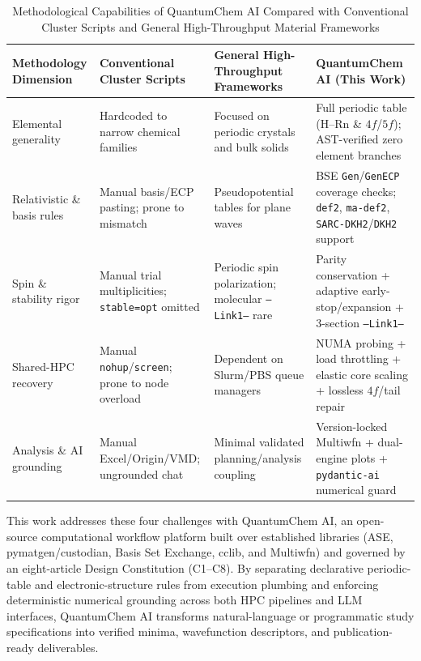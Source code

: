 \documentclass[journal=jctcce,manuscript=article]{achemso}
\begin{document}
\begin{table}[htbp]
  \centering
  \caption{Methodological Capabilities of QuantumChem AI Compared with Conventional Cluster Scripts and General High-Throughput Material Frameworks}
  \label{tab:capabilities}
  \footnotesize
  \begin{tabular}{>{\raggedright\arraybackslash}p{2.4cm} >{\raggedright\arraybackslash}p{3.6cm} >{\raggedright\arraybackslash}p{3.7cm} >{\raggedright\arraybackslash}p{4.3cm}}
    \toprule
    Methodology Dimension & Conventional Cluster Scripts & General High-Throughput Frameworks & QuantumChem AI (This Work) \\
    \midrule
    Elemental generality & Hardcoded to narrow chemical families & Focused on periodic crystals and bulk solids & Full periodic table (H--Rn \& $4f$/$5f$); AST-verified zero element branches \\
    Relativistic \& basis rules & Manual basis/ECP pasting; prone to mismatch & Pseudopotential tables for plane waves & BSE \texttt{Gen}/\texttt{GenECP} coverage checks; \texttt{def2}, \texttt{ma-def2}, \texttt{SARC-DKH2}/\texttt{DKH2} support \\
    Spin \& stability rigor & Manual trial multiplicities; \texttt{stable=opt} omitted & Periodic spin polarization; molecular \texttt{--Link1--} rare & Parity conservation + adaptive early-stop/expansion + 3-section \texttt{--Link1--} \\
    Shared-HPC recovery & Manual \texttt{nohup}/\texttt{screen}; prone to node overload & Dependent on Slurm/PBS queue managers & NUMA probing + load throttling + elastic core scaling + lossless $4f$/tail repair \\
    Analysis \& AI grounding & Manual Excel/Origin/VMD; ungrounded chat & Minimal validated planning/analysis coupling & Version-locked Multiwfn + dual-engine plots + \texttt{pydantic-ai} numerical guard \\
    \bottomrule
  \end{tabular}
\end{table}

This work addresses these four challenges with QuantumChem AI, an open-source computational workflow platform built over established libraries (ASE,\cite{larsen2017ase} pymatgen/custodian,\cite{ong2013pymatgen} Basis Set Exchange,\cite{pritchard2019bse} cclib,\cite{oboyle2008cclib} and Multiwfn\cite{lu2012multiwfn}) and governed by an eight-article Design Constitution (C1--C8). By separating declarative periodic-table and electronic-structure rules from execution plumbing and enforcing deterministic numerical grounding across both HPC pipelines and LLM interfaces, QuantumChem AI transforms natural-language or programmatic study specifications into verified minima, wavefunction descriptors, and publication-ready deliverables.
\end{document}
